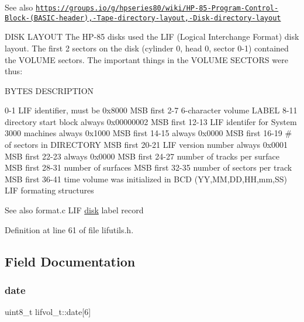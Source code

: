 \begin{DoxySeeAlso}{See also}
\href{https://groups.io/g/hpseries80/wiki/HP-85-Program-Control-Block-(BASIC-header),-Tape-directory-layout,-Disk-directory-layout}{\tt https\+://groups.\+io/g/hpseries80/wiki/\+H\+P-\/85-\/\+Program-\/\+Control-\/\+Block-\/(\+B\+A\+S\+I\+C-\/header),-\/\+Tape-\/directory-\/layout,-\/\+Disk-\/directory-\/layout}
\end{DoxySeeAlso}
D\+I\+SK L\+A\+Y\+O\+UT The H\+P-\/85 disks used the L\+IF (Logical Interchange Format) disk layout. The first 2 sectors on the disk (cylinder 0, head 0, sector 0-\/1) contained the V\+O\+L\+U\+ME sectors. The important things in the V\+O\+L\+U\+ME S\+E\+C\+T\+O\+RS were thus\+:

B\+Y\+T\+ES D\+E\+S\+C\+R\+I\+P\+T\+I\+ON 

 0-\/1 L\+IF identifier, must be 0x8000 M\+SB first 2-\/7 6-\/character volume L\+A\+B\+EL 8-\/11 directory start block always 0x00000002 M\+SB first 12-\/13 L\+IF identifer for System 3000 machines always 0x1000 M\+SB first 14-\/15 always 0x0000 M\+SB first 16-\/19 \# of sectors in D\+I\+R\+E\+C\+T\+O\+RY M\+SB first 20-\/21 L\+IF version number always 0x0001 M\+SB first 22-\/23 always 0x0000 M\+SB first 24-\/27 number of tracks per surface M\+SB first 28-\/31 number of surfaces M\+SB first 32-\/35 number of sectors per track M\+SB first 36-\/41 time volume was initialized in B\+CD (YY,MM,DD,HH,mm,SS) L\+IF formating structures \begin{DoxySeeAlso}{See also}
format.\+c L\+IF \hyperlink{td02lif_8c_affcceda12b139f26819f4929be705eb1}{disk} label record 
\end{DoxySeeAlso}


Definition at line 61 of file lifutils.\+h.



\subsection{Field Documentation}
\mbox{\label{structlifvol__t_a41f630e7211326270dc6e72a55f94516}} 
\subsubsection{\texorpdfstring{date}{date}}
{\footnotesize\ttfamily uint8\+\_\+t lifvol\+\_\+t\+::date\mbox{[}6\mbox{]}}



